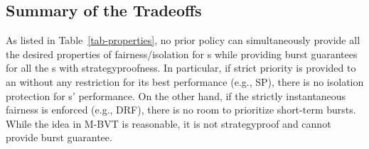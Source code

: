 %
%
%
%

\subsection{Summary of the Tradeoffs}

As listed in Table~\ref{tab-properties}, no prior policy can simultaneously provide all the desired properties of fairness/isolation for {\batchq}s while providing burst guarantees for all the {\burstq}s with strategyproofness. In particular, if strict priority is provided to an \burstq without any restriction for its best performance (e.g., SP), there is no isolation protection for {\batchq}s' performance. On the other hand, if the strictly instantaneous fairness is enforced (e.g., DRF), there is no room to prioritize short-term bursts. While the idea in M-BVT is reasonable, it is not strategyproof and cannot provide burst guarantee.

